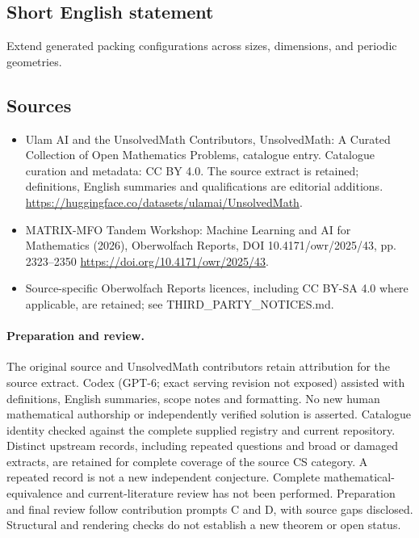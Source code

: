 \documentclass[11pt]{article}
\begin{document}
\subsection{Short English statement}
Extend generated packing configurations across sizes, dimensions, and periodic geometries.
\subsection{Sources}
\begin{itemize}
\item[\hypertarget{source:statement:1}{S1}] Ulam AI and the UnsolvedMath Contributors, UnsolvedMath: A Curated Collection of Open Mathematics Problems, catalogue entry. Catalogue curation and metadata: CC BY 4.0. The source extract is retained; definitions, English summaries and qualifications are editorial additions.
\url{https://huggingface.co/datasets/ulamai/UnsolvedMath}.
\item[\hypertarget{source:statement:2}{S2}] MATRIX-MFO Tandem Workshop: Machine Learning and AI for Mathematics (2026), Oberwolfach Reports, DOI 10.4171/owr/2025/43, pp. 2323--2350
\url{https://doi.org/10.4171/owr/2025/43}.
\item Source-specific Oberwolfach Reports licences, including CC BY-SA 4.0 where applicable, are retained; see THIRD\_PARTY\_NOTICES.md.
\end{itemize}
\paragraph{Preparation and review.}
The original source and UnsolvedMath contributors retain attribution for the source extract. Codex (GPT-6; exact serving revision not exposed) assisted with definitions, English summaries, scope notes and formatting. No new human mathematical authorship or independently verified solution is asserted. Catalogue identity checked against the complete supplied registry and current repository. Distinct upstream records, including repeated questions and broad or damaged extracts, are retained for complete coverage of the source CS category. A repeated record is not a new independent conjecture. Complete mathematical-equivalence and current-literature review has not been performed. Preparation and final review follow contribution prompts C and D, with source gaps disclosed. Structural and rendering checks do not establish a new theorem or open status.
\label{end:statement}
\end{document}
